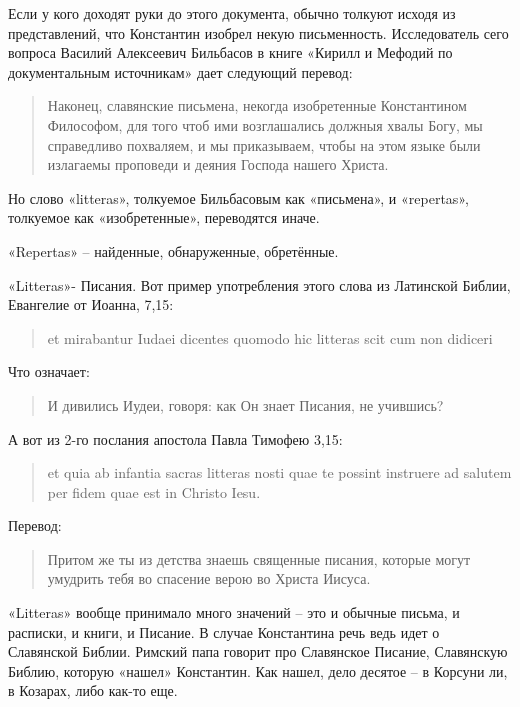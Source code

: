 Если у кого доходят руки до этого документа, обычно толкуют исходя из представлений, что Константин изобрел некую письменность. Исследователь сего вопроса Василий Алексеевич Бильбасов в книге «Кирилл и Мефодий по документальным источникам»\cite{bilbasov} дает следующий перевод:

\begin{quotation}
Наконец, славянские письмена, некогда изобретенные Константином Философом, для того чтоб ими возглашались должныя хвалы Богу, мы справедливо похваляем, и мы приказываем, чтобы на этом языке были излагаемы проповеди и деяния Господа нашего Христа.
\end{quotation}

Но слово «litteras», толкуемое Бильбасовым как «письмена», и «repertas», толкуемое как «изобретенные», переводятся иначе. 

«Repertas» – найденные, обнаруженные, обретённые.

«Litteras»- Писания. Вот пример употребления этого слова из Латинской Библии, Евангелие от Иоанна, 7,15:

\begin{quotation}
\begin{otherlanguage}{latin}
et mirabantur Iudaei dicentes quomodo hic litteras scit cum non didiceri  
\end{otherlanguage}
\end{quotation}

Что означает:

\begin{quotation}
И дивились Иудеи, говоря: как Он знает Писания, не учившись? 
\end{quotation}

А вот из 2-го послания апостола Павла Тимофею 3,15:

\begin{quotation}
\begin{otherlanguage}{latin}
et quia ab infantia sacras litteras nosti quae te possint instruere ad salutem per fidem quae est in Christo Iesu.
\end{otherlanguage}
\end{quotation}

Перевод:

\begin{quotation}
Притом же ты из детства знаешь священные писания, которые могут умудрить тебя во спасение верою во Христа Иисуса. 
\end{quotation}

«Litteras» вообще принимало много значений – это и обычные письма, и расписки, и книги, и Писание. В случае Константина речь ведь идет о Славянской Библии. Римский папа говорит про Славянское Писание, Славянскую Библию, которую «нашел» Константин. Как нашел, дело десятое – в Корсуни ли, в Козарах, либо как-то еще.

